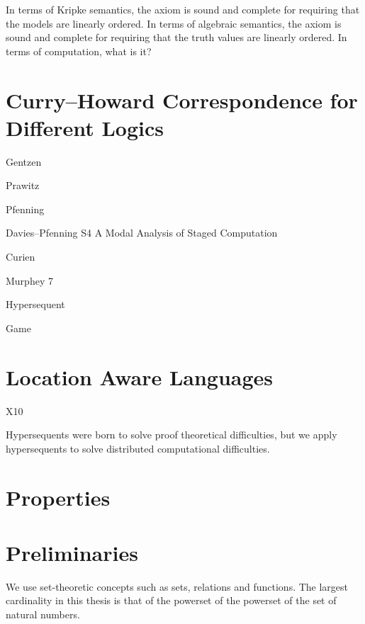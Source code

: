 In terms of Kripke semantics, the axiom is sound and complete for
requiring that the models are linearly ordered.
In terms of algebraic semantics, the axiom is sound and complete for
requiring that the truth values are linearly ordered.  
In terms of computation, what is it?

\section{Curry--Howard Correspondence for Different Logics}

Gentzen

Prawitz

Pfenning

Davies--Pfenning S4 A Modal Analysis of Staged Computation

Curien

Murphey 7

Hypersequent

Game

\section{Location Aware Languages}

X10


Hypersequents were born to solve proof theoretical difficulties, but we
apply hypersequents to solve distributed computational difficulties.

\section{Properties}


\section{Preliminaries}

We use set-theoretic concepts such as sets, relations and functions.
The largest cardinality in this thesis is that of the
powerset of the powerset of the set of natural numbers.